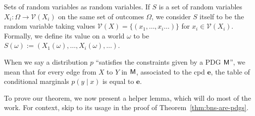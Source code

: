 \documentclass{article}
\theoremstyle{plain}
\theoremstyle{definition}
\theoremstyle{remark}
\newcommand{\V}{\mathcal V}
\numberwithin{equation}{section}
\begin{document}
\begin{defn} \label{def:set-rv}
	Sets of random variables as random variables. If $S$ is a set of random variables $X_i : \Omega \to \V(X_i)$ on the same set of outcomes $\Omega$, we consider $S$ itself to be the random variable taking values $\V(X) = \{(x_1, \ldots, x_i \ldots) \}$ for $x_i \in \V(X_i)$. Formally, we define its value on a world $\omega$ to be $S(\omega) := (X_1(\omega), \ldots, X_i(\omega), \ldots)$. 
\end{defn}


When we say a distribution $p$ ``satisfies the constraints given by a PDG $\sf M$'', we mean that for every edge from $X$ to $Y$ in $\sf M$, associated to the cpd $\mathbf e$, the table of conditional marginals $p(y \mid x)$ is equal to $\mathbf e$.

To prove our theorem, we now present a helper lemma, which will do most of the work. For context, skip to its usage in the proof of Theorem~\ref{thm:bns-are-pdgs}.
\end{document}
